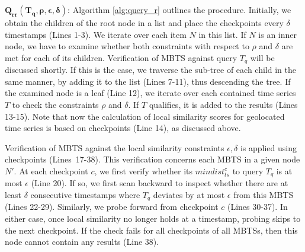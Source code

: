 \vspace{2mm}

\noindent $\mathbold{Q_{rr}(T_q, \rho, \epsilon, \delta)}$: Algorithm \ref{alg:query_r} outlines the procedure. Initially, we obtain the children of the root node in a list and place the checkpoints every $\delta$ timestamps (Lines 1-3). We iterate over each item $N$ in this list. If $N$ is an inner node, we have to examine whether both constraints with respect to $\rho$ and $\delta$ are met for each of its children. Verification of MBTS against query $T_q$ will be discussed shortly. If this is the case, we traverse the sub-tree of each child in the same manner, by adding it to the list (Lines 7-11), thus descending the tree. If the examined node is a leaf (Line 12), we iterate over each contained time series $T$ to check the constraints $\rho$ and $\delta$. If $T$ qualifies, it is added to the results (Lines 13-15). Note that now the calculation of local similarity scores for geolocated time series is based on checkpoints (Line 14), as discussed above.

Verification of MBTS against the local similarity constraints $\epsilon, \delta$ is applied using checkpoints (Lines~17-38). This verification concerns each MBTS in a given node $N'$. At each checkpoint $c$, we first verify whether its $mindist_{ts}^c$ to query $T_q$ is at most $\epsilon$ (Line 20). If so, we first scan backward to inspect whether there are at least $\delta$ consecutive timestamps where $T_q$ deviates by at most $\epsilon$ from this MBTS (Lines 22-29). Similarly, we probe forward from checkpoint $c$ (Lines 30-37). In either case, once local similarity no longer holds at a timestamp, probing skips to the next checkpoint. If the check fails for all checkpoints of all MBTSs, then this node cannot contain any results (Line 38).


